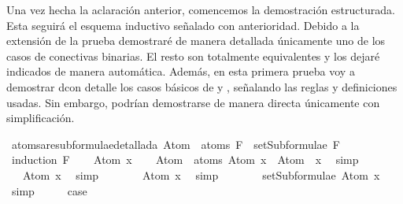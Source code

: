 \begin{isabellebody}
\begin{isamarkuptext}
\begin{itemize}
  \end{itemize}%
\end{isamarkuptext}\isamarkuptrue%
%
\begin{isamarkuptext}%
Una vez hecha la aclaración anterior, comencemos la demostración estructurada. 
Esta seguirá el esquema inductivo señalado con anterioridad. Debido a la extensión de la prueba
demostraré de manera detallada únicamente uno de los casos de conectivas binarias. El resto son
totalmente equivalentes y los dejaré indicados de manera automática. Además, en esta primera 
prueba voy a demostrar dcon detalle los casos básicos de  y \isa{{\isasymbottom}}, 
señalando las reglas y definiciones usadas. Sin embargo, podrían demostrarse de manera directa
únicamente con simplificación.%
\end{isamarkuptext}\isamarkuptrue%
\isamarkupfalse%
\ atoms{\isacharunderscore}are{\isacharunderscore}subformulae{\isacharunderscore}detallada{\isacharcolon}\ {\isachardoublequoteopen}Atom\ {\isacharbackquote}\ atoms\ F\ {\isasymsubseteq}\ setSubformulae\ F{\isachardoublequoteclose}\isanewline
%
\isadelimproof
%
\endisadelimproof
%
\isatagproof
{}\isamarkupfalse%
\ {\isacharparenleft}induction\ F{\isacharparenright}\isanewline
\ \ \isamarkupfalse%
\ {\isacharparenleft}Atom\ x{\isacharparenright}\isanewline
\ \ \isamarkupfalse%
\ {\isachardoublequoteopen}Atom\ {\isacharbackquote}\ atoms\ {\isacharparenleft}Atom\ x{\isacharparenright}\ {\isacharequal}\ Atom\ {\isacharbackquote}\ {\isacharbraceleft}x{\isacharbraceright}{\isachardoublequoteclose}\ \isamarkupfalse%
\ simp\isanewline
\ \ \isamarkupfalse%
\ \isamarkupfalse%
\ {\isachardoublequoteopen}{\isasymdots}\ {\isacharequal}\ {\isacharbraceleft}Atom\ x{\isacharbraceright}{\isachardoublequoteclose}\ \isamarkupfalse%
\ simp\isanewline
\ \ \isamarkupfalse%
\ \isamarkupfalse%
\ {\isachardoublequoteopen}{\isasymdots}\ {\isasymsubseteq}\ {\isacharbraceleft}Atom\ x{\isacharbraceright}{\isachardoublequoteclose}\ \isamarkupfalse%
\ simp\isanewline
\ \ \isamarkupfalse%
\ \isamarkupfalse%
\ {\isachardoublequoteopen}{\isasymdots}\ {\isacharequal}\ setSubformulae\ {\isacharparenleft}Atom\ x{\isacharparenright}{\isachardoublequoteclose}\ \isamarkupfalse%
\ simp\isanewline
\ \ \isamarkupfalse%
\ \isamarkupfalse%
\ {\isacharquery}case\ \isamarkupfalse%

\end{isabellebody}
